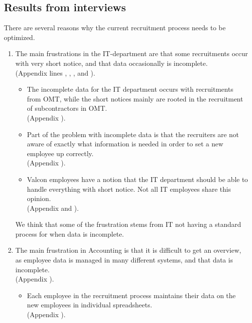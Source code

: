 \subsection{Results from interviews}
There are several reasons why the current recruitment process needs to be optimized.

\begin{enumerate}
\item The main frustrations in the IT-department are that some recruitments occur with very short notice, and that data occasionally is incomplete.\\
(Appendix  lines , , , and ).
\begin{itemize}
\item The incomplete data for the IT department occurs with recruitments from OMT, while the short notices mainly are rooted in the recruitment of subcontractors in OMT.\\
(Appendix ).
\item Part of the problem with incomplete data is that the recruiters are not aware of exactly what information is needed in order to set a new employee up correctly.\\
(Appendix ).
\item Valcon employees have a notion that the IT department should be able to handle everything with short notice. Not all IT employees share this opinion.\\
(Appendix  and ).
\end{itemize}

\noindent We think that some of the frustration stems from IT not having a standard process for when data is incomplete.

\item The main frustration in Accounting is that it is difficult to get an overview, as employee data is managed in many different systems, and that data is incomplete.\\
(Appendix ).
\begin{itemize}
\item Each employee in the recruitment process maintains their data on the new employees in individual spreadsheets.\\
(Appendix ).
\end{itemize}


\end{enumerate}
